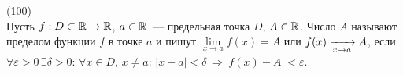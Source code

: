 (100)\\
Пусть $f: D \subset \mathbb{R} \to \mathbb{R}$, $a \in \mathbb{R}$~--- предельная точка $D$, $A \in \mathbb{R}$. Число $A$ называют пределом функции $f$ в точке $a$ и пишут $\lim\limits_{x\to a} f(x) = A$ или $f(x) \xrightarrow[x\to a]{} A$, если $\forall \varepsilon > 0 \, \exists \delta > 0:\, \forall x \in D,\, x \neq a:\, |x - a| < \delta\, \Rightarrow |f(x) - A| < \varepsilon$.